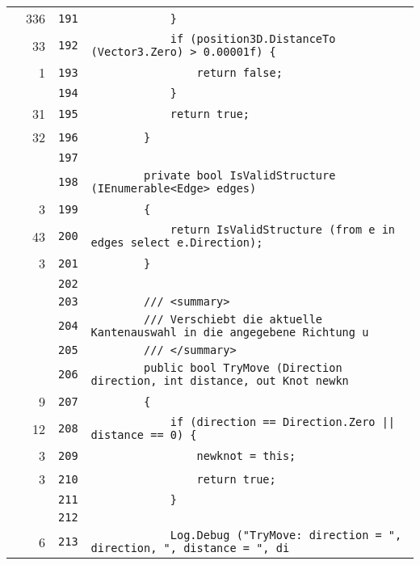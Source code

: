 \documentclass[a4paper,10pt]{article}
\begin{document}
\begin{longtable}[l]{lrrl}
\cellcolor{green} & 336 & \verb~191~ & \verb~            }~\\
\cellcolor{green} & 33 & \verb~192~ & \verb~            if (position3D.DistanceTo (Vector3.Zero) > 0.00001f) {~\\
\cellcolor{green} & 1 & \verb~193~ & \verb~                return false;~\\
\cellcolor{gray} &  & \verb~194~ & \verb~            }~\\
\cellcolor{green} & 31 & \verb~195~ & \verb~            return true;~\\
\cellcolor{green} & 32 & \verb~196~ & \verb~        }~\\
\cellcolor{gray} &  & \verb~197~ & \verb~~\\
\cellcolor{gray} &  & \verb~198~ & \verb~        private bool IsValidStructure (IEnumerable<Edge> edges)~\\
\cellcolor{green} & 3 & \verb~199~ & \verb~        {~\\
\cellcolor{green} & 43 & \verb~200~ & \verb~            return IsValidStructure (from e in edges select e.Direction);~\\
\cellcolor{green} & 3 & \verb~201~ & \verb~        }~\\
\cellcolor{gray} &  & \verb~202~ & \verb~~\\
\cellcolor{gray} &  & \verb~203~ & \verb~        /// <summary>~\\
\cellcolor{gray} &  & \verb~204~ & \verb~        /// Verschiebt die aktuelle Kantenauswahl in die angegebene Richtung u~\\
\cellcolor{gray} &  & \verb~205~ & \verb~        /// </summary>~\\
\cellcolor{gray} &  & \verb~206~ & \verb~        public bool TryMove (Direction direction, int distance, out Knot newkn~\\
\cellcolor{green} & 9 & \verb~207~ & \verb~        {~\\
\cellcolor{green} & 12 & \verb~208~ & \verb~            if (direction == Direction.Zero || distance == 0) {~\\
\cellcolor{green} & 3 & \verb~209~ & \verb~                newknot = this;~\\
\cellcolor{green} & 3 & \verb~210~ & \verb~                return true;~\\
\cellcolor{gray} &  & \verb~211~ & \verb~            }~\\
\cellcolor{gray} &  & \verb~212~ & \verb~~\\
\cellcolor{green} & 6 & \verb~213~ & \verb~            Log.Debug ("TryMove: direction = ", direction, ", distance = ", di~\\

\end{longtable}
\end{document}
